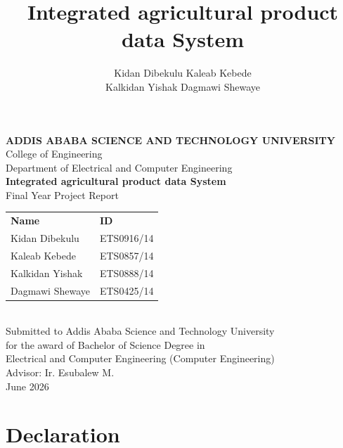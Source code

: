 \documentclass[12pt,a4paper,oneside]{report}
\title{Integrated agricultural product data System}
\author{%
  Kidan Dibekulu \quad Kaleab Kebede \\
  Kalkidan Yishak \quad Dagmawi Shewaye
}
\begin{document}
\begin{titlepage}
\begin{center}

\vspace*{2cm}

{\LARGE\bfseries ADDIS ABABA SCIENCE AND TECHNOLOGY UNIVERSITY}\\[0.5cm]
{\large College of Engineering}\\[0.2cm]
{\large Department of Electrical and Computer Engineering}\\[1.5cm]

{\Huge\bfseries Integrated agricultural product data System}\\[1.5cm]

{\large Final Year Project Report}\\[1cm]

\begin{tabular}{ll}
\textbf{Name} & \textbf{ID} \\
Kidan Dibekulu  & ETS0916/14 \\
Kaleab Kebede   & ETS0857/14 \\
Kalkidan Yishak & ETS0888/14 \\
Dagmawi Shewaye & ETS0425/14 \\
\end{tabular}\\[1.5cm]

{\large Submitted to Addis Ababa Science and Technology University}\\
{\large for the award of Bachelor of Science Degree in}\\
{\large Electrical and Computer Engineering (Computer Engineering)}\\[1cm]

{\large Advisor: Ir. Esubalew M.}\\[1cm]

{\large June 2026}

\end{center}
\end{titlepage}

\chapter*{Declaration}
\end{document}
